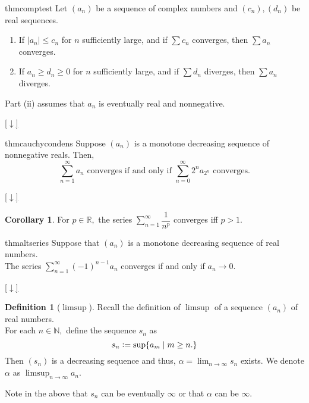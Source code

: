 \documentclass[12pt,oneside]{book}
\theoremstyle{definition}
\numberwithin{thm}{chapter}
\newtheorem{defn}[thm]{Definition}
\newtheorem{cor}[thm]{Corollary}
\newcommand{\downsym}{[$\downarrow$]}
\begin{document}
\begin{restatable}{thm}{comptest}
\label{thm:comptest}
	Let $(a_n)$ be a sequence of complex numbers and $(c_n), (d_n)$ be real sequences.
	\begin{enumerate}[label = (\roman*)]
		\item If $|a_n| \le c_n$ for $n$ sufficiently large, and if $\sum c_n$ converges, then $\sum a_n$ converges.
		\item If $a_n \ge d_n \ge 0$ for $n$ sufficiently large, and if $\sum d_n$ diverges, then $\sum a_n$ diverges.
	\end{enumerate}
	Part (ii) assumes that $a_n$ is eventually real and nonnegative.
\end{restatable}
\begin{flushright}\hyperref[thm:comptest2]{\downsym}\end{flushright}

\begin{restatable}{thm}{cauchycondens}
\label{thm:cauchycondens}
	Suppose $(a_n)$ is a monotone decreasing sequence of nonnegative reals. Then,
	\begin{equation*} 
		\sum_{n=1}^{\infty}a_n \text{ converges if and only if } \sum_{n=0}^{\infty}2^na_{2^n} \text{ converges}.
	\end{equation*}
\end{restatable}
\begin{flushright}\hyperref[thm:cauchycondens2]{\downsym}\end{flushright}

\begin{cor}
	For $p \in \mathbb{R},$ the series $\displaystyle\sum_{n=1}^{\infty}\dfrac{1}{n^p}$ converges iff $p > 1.$
\end{cor}

\begin{restatable}{thm}{altseries}
\label{thm:altseries}
	Suppose that $(a_n)$ is a monotone decreasing sequence of real numbers.\\
	The series $\displaystyle\sum_{n=1}^{\infty}(-1)^{n-1}a_n$ converges if and only if $a_n \to 0.$
\end{restatable}
\begin{flushright}\hyperref[thm:altseries2]{\downsym}\end{flushright}

\begin{defn}[$\limsup$]
	Recall the definition of $\limsup$ of a sequence $(a_n)$ of real numbers.\\
	For each $n \in \mathbb{N},$ define the sequence $s_n$ as 
	\begin{equation*} 
		s_n \vcentcolon= \sup\{a_m \mid m \ge n.\}
	\end{equation*}
	Then $(s_n)$ is a decreasing sequence and thus, $\alpha = \displaystyle\lim_{n\to \infty}s_n$ exists. We denote $\alpha$ as $\limsup_{n\to\infty}a_n.$
\end{defn}
Note in the above that $s_n$ can be eventually $\infty$ or that $\alpha$ can be $\infty.$
\end{document}
